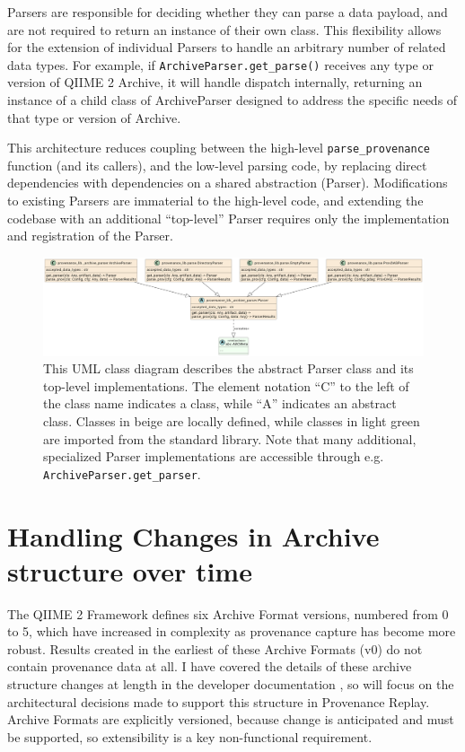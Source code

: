 Parsers are responsible for deciding whether they can parse a data payload, and
are not required to return an instance of their own class. This flexibility
allows for the extension of individual Parsers to handle an arbitrary number of
related data types. For example, if \texttt{ArchiveParser.get\_parse()} receives any type
or version of QIIME 2 Archive, it will handle dispatch internally, returning an
instance of a child class of ArchiveParser designed to address the specific
needs of that type or version of Archive.

This architecture reduces coupling between the high-level \texttt{parse\_provenance}
function (and its callers), and the low-level parsing code, by replacing direct
dependencies with dependencies on a shared abstraction (Parser). Modifications
to existing Parsers are immaterial to the high-level code, and extending the
codebase with an additional “top-level” Parser requires only the implementation
and registration of the Parser. 

\begin{figure}[htp]
\centering
\includegraphics[width=\textwidth]{figures/allParsersUML.png}
\caption[UML Class diagram of the abstract Parser class and its implementations]%
{This UML class diagram describes the abstract Parser class and its top-level
implementations. The element notation “C” to the left of the class name
indicates a class, while “A” indicates an abstract class. Classes in beige are
locally defined, while classes in light green are imported from the standard
library. Note that many additional, specialized Parser implementations are
accessible through e.g. \texttt{ArchiveParser.get\_parser}.}
\label{fig:allParsersUML}
\end{figure}


\section{Handling Changes in Archive structure over time}

The QIIME 2 Framework defines six Archive Format versions, numbered from 0 to 5,
which have increased in complexity as provenance capture has become more robust.
Results created in the earliest of these Archive Formats (v0) do not contain
provenance data at all. I have covered the details of these archive structure
changes at length in the developer documentation \parencite{qiime_2_development_team_archive_2018},
so will focus on the architectural decisions made to support this structure in
Provenance Replay.  Archive Formats are explicitly versioned, because change is
anticipated and must be supported, so extensibility is a key non-functional
requirement.

